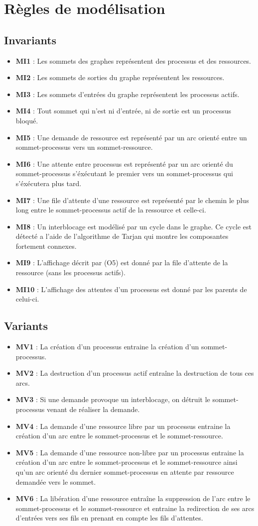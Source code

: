 \documentclass{article}
\newcommand{\bitem}{\item[\textbullet]}
\begin{document}
\section{Règles de modélisation}

\subsection{Invariants}
\begin{itemize}
  \bitem \textbf{MI1} : Les sommets des graphes représentent des processus et des ressources.
  \bitem \textbf{MI2} : Les sommets de sorties du graphe représentent les ressources.
  \bitem \textbf{MI3} : Les sommets d'entrées du graphe représentent les processus actifs.
  \bitem \textbf{MI4} : Tout sommet qui n'est ni d'entrée, ni de sortie est un processus bloqué.
  \bitem \textbf{MI5} : Une demande de ressource est représenté par un arc orienté entre un sommet-processus vers un sommet-ressource.
  \bitem \textbf{MI6} : Une attente entre processus est représenté par un arc orienté du sommet-processus s'éxécutant le premier vers un sommet-processus qui s'éxécutera plus tard.
  \bitem \textbf{MI7} : Une file d'attente d'une ressource est représenté par le chemin le plus long entre le sommet-processus actif de la ressource et celle-ci.
  \bitem \textbf{MI8} : Un interblocage est modélisé par un cycle dans le graphe. Ce cycle est détecté a l'aide de l'algorithme de Tarjan qui montre les composantes fortement connexes.
  \bitem \textbf{MI9} : L'affichage décrit par (O5) est donné par la file d'attente de la ressource (sans les processus actifs).
  \bitem \textbf{MI10} : L'affichage des attentes d'un processus est donné par les parents de celui-ci.
\end{itemize}

\subsection{Variants}
\begin{itemize}
  \bitem \textbf{MV1} : La création d'un processus entraine la création d'un sommet-processus.
  \bitem \textbf{MV2} : La destruction d'un processus actif entraîne la destruction de tous ces arcs.
  \bitem \textbf{MV3} : Si une demande provoque un interblocage, on détruit le sommet-processus venant de réaliser la demande.
  \bitem \textbf{MV4} : La demande d'une ressource libre par un processus entraine la création  d'un arc entre le sommet-processus et le sommet-ressource.
  \bitem \textbf{MV5} : La demande d'une ressource non-libre par un processus entraine la création  d'un arc entre le sommet-processus et le sommet-ressource ainsi qu'un arc orienté du dernier sommet-processus en attente par ressource demandée vers le sommet.
  \bitem \textbf{MV6} : La libération d'une ressource entraîne la suppression de l'arc entre le sommet-processus et le sommet-ressource et entraine la redirection de ses arcs d'entrées vers ses fils en prenant en compte les fils d'attentes.
\end{itemize}
\end{document}
